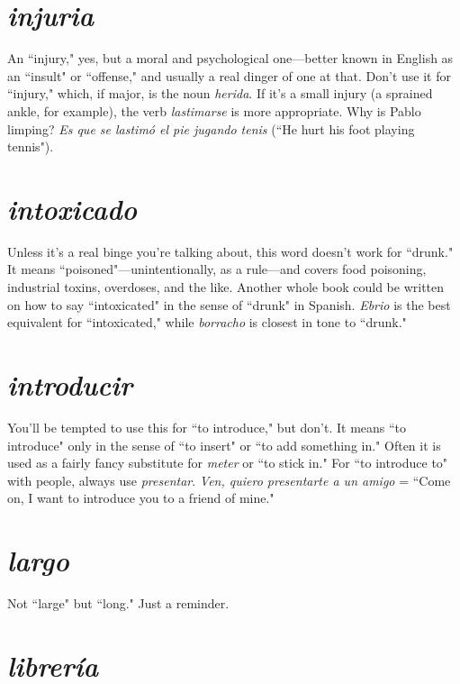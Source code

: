 \section{\emph{injuria}}

An ``injury," yes, but a moral and psychological
one---better known in English as an ``insult" or ``offense," and usually
a real dinger of one at that. Don't use it for ``injury," which, if major, is
the noun \emph{herida}. If it's a small injury (a sprained ankle, for example),
the verb \emph{lastimarse} is more appropriate. Why is Pablo limping? \emph{Es que
	se lastimó el pie jugando tenis} (``He hurt his foot playing tennis").

\section{\emph{intoxicado}}

Unless it's a real binge you're talking about,
this word doesn't work for ``drunk." It means ``poisoned"---unintentionally, as a rule---and covers food poisoning, industrial toxins, overdoses, and the like. Another whole book could be written on how to
say ``intoxicated" in the sense of ``drunk" in Spanish. \emph{Ebrio} is the
best equivalent for ``intoxicated," while \emph{borracho} is closest in tone to ``drunk."

\section{\emph{introducir}}

You'll be tempted to use this for ``to introduce,"
but don't. It means ``to introduce" only in the sense of ``to insert" or
``to add something in." Often it is used as a fairly fancy substitute for
\emph{meter} or ``to stick in." For ``to introduce to" with people, always use
\emph{presentar}. \emph{Ven, quiero presentarte a un amigo} = ``Come on, I want to
introduce you to a friend of mine."

\section{\emph{largo}}

Not ``large" but ``long." Just a reminder.

\section{\emph{librería}}

